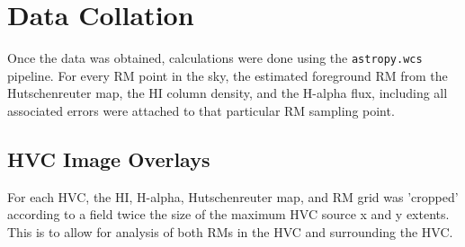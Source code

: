 \section{Data Collation}
\label{sec:collation}

Once the data was obtained, calculations were done using the \verb|astropy.wcs| pipeline. For every RM point in the sky, the estimated foreground RM from the Hutschenreuter map, the HI column density, and the H-alpha flux, including all associated errors were attached to that particular RM sampling point.

\subsection{HVC Image Overlays}
\label{ssec:hvc_snapshot}

For each HVC, the HI, H-alpha, Hutschenreuter map, and RM grid was 'cropped' according to a field twice the size of the maximum HVC source x and y extents. This is to allow for analysis of both RMs in the HVC and surrounding the HVC.


